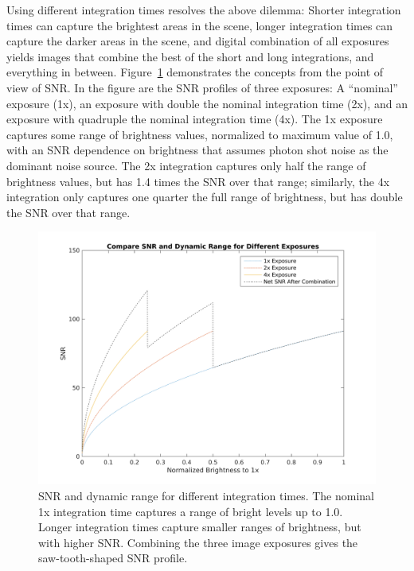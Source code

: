 \documentclass[10pt,journal]{IEEEtran}  %
\begin{document}
Using different integration times resolves the above dilemma: Shorter integration times can capture the brightest areas in the scene, longer integration times can capture the darker areas in the scene, and digital combination of all exposures yields images that combine the best of the short and long integrations, and everything in between.  Figure~\ref{fig:hdr_snr_example} demonstrates the concepts from the point of view of SNR. In the figure are the SNR profiles of three exposures:  A ``nominal'' exposure (1x), an exposure with double the nominal integration time (2x), and an exposure with quadruple the nominal integration time (4x). The 1x exposure captures some range of brightness values, normalized to maximum value of 1.0, with an SNR dependence on brightness that assumes photon shot noise as the dominant noise source. The 2x integration captures only half the range of brightness values, but has 1.4 times the SNR over that range; similarly, the 4x integration only captures one quarter the full range of brightness, but has double the SNR over that range.

\begin{figure}
  \includegraphics[width=\columnwidth]{figures/hdr-design-snr-hdr-examples.png}
  \caption{SNR and dynamic range for different integration times. The nominal 1x integration time captures a range of bright levels up to 1.0.  Longer integration times capture smaller ranges of brightness, but with higher SNR. Combining the three image exposures gives the saw-tooth-shaped SNR profile. \label{fig:hdr_snr_example}}
\end{figure}
\end{document}
